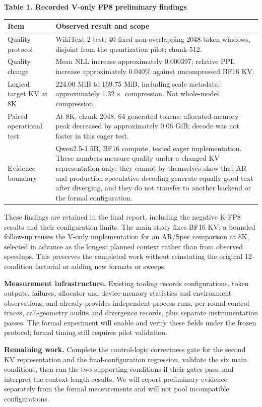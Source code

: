 \documentclass[11pt,a4paper]{article}
\begin{document}
\textbf{Table 1. Recorded V-only FP8 preliminary findings}\par
\begin{tabularx}{\linewidth}{@{}>{\raggedright\arraybackslash}p{3.3cm} X@{}}
\toprule
\textbf{Item} & \textbf{Observed result and scope} \\
\midrule
Quality protocol & WikiText-2 test; 40 fixed non-overlapping 2048-token windows, disjoint from the quantization pilot; chunk 512. \\
Quality change & Mean NLL increase approximately 0.000397; relative PPL increase approximately 0.040\% against uncompressed BF16 KV. \\
Logical target KV at 8K & 224.00 MiB to 169.75 MiB, including scale metadata: approximately $1.32\times$ compression. Not whole-model compression. \\
Paired operational test & At 8K, chunk 2048, 64 generated tokens: allocated-memory peak decreased by approximately 0.06 GiB; decode was not faster in this eager test. \\
Evidence boundary & Qwen2.5-1.5B, BF16 compute, tested eager implementation. These numbers measure quality under a changed KV representation only; they cannot by themselves show that AR and production speculative decoding generate equally good text after diverging, and they do not transfer to another backend or the formal configuration. \\
\bottomrule
\end{tabularx}

These findings are retained in the final report, including the negative K-FP8 results and their configuration limits. The main study fixes BF16 KV; a bounded follow-up reuses the V-only implementation for an AR/Spec comparison at 8K, selected in advance as the longest planned context rather than from observed speedups. This preserves the completed work without reinstating the original 12-condition factorial or adding new formats or sweeps.

\textbf{Measurement infrastructure.} Existing tooling records configurations, token outputs, failures, allocator and device-memory statistics and environment observations, and already provides independent-process runs, per-round control traces, call-geometry audits and divergence records, plus separate instrumentation passes. The formal experiment will enable and verify these fields under the frozen protocol; formal timing still requires pilot validation.

\textbf{Remaining work.} Complete the control-logic correctness gate for the second KV representation and the final-configuration regression, validate the six main conditions, then run the two supporting conditions if their gates pass, and interpret the context-length results. We will report preliminary evidence separately from the formal measurements and will not pool incompatible configurations.
\end{document}
